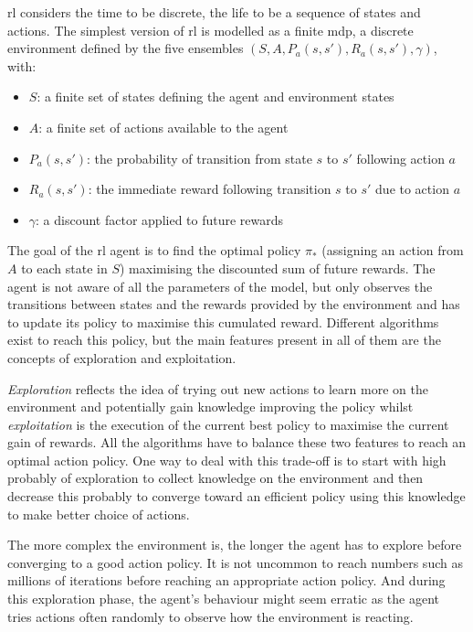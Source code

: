 	\gls{rl} considers the time to be discrete, the life to be a sequence of states and actions. The simplest version of \gls{rl} is modelled as a finite \acrfull{mdp}, a discrete environment defined by the five ensembles $(S, A, P_a(s,s'), R_a(s,s'), \gamma)$, with:
	\begin{itemize}
		\item $S$: a finite set of states defining the agent and environment states
		\item $A$: a finite set of actions available to the agent
		\item $P_a(s,s')$: the probability of transition from state $s$ to $s'$ following action $a$
		\item $R_a(s,s')$: the immediate reward following transition $s$ to $s'$ due to action $a$
		\item $\gamma$: a discount factor applied to future rewards
	\end{itemize}
	
	The goal of the \gls{rl} agent is to find the optimal policy $\pi_*$ (assigning an action from $A$ to each state in $S$) maximising the discounted sum of future rewards. The agent is not aware of all the parameters of the model, but only observes the transitions between states and the rewards provided by the environment and has to update its policy to maximise this cumulated reward. Different algorithms exist to reach this policy, but the main features present in all of them are the concepts of exploration and exploitation.
	
	\textit{Exploration} reflects the idea of trying out new actions to learn more on the environment and potentially gain knowledge improving the policy whilst \textit{exploitation} is the execution of the current best policy to maximise the current gain of rewards. All the algorithms have to balance these two features to reach an optimal action policy. One way to deal with this trade-off is to start with high probably of exploration to collect knowledge on the environment and then decrease this probably to converge toward an efficient policy using this knowledge to make better choice of actions.
	
	The more complex the environment is, the longer the agent has to explore before converging to a good action policy. It is not uncommon to reach numbers such as millions of iterations before reaching an appropriate action policy. And during this exploration phase, the agent's behaviour might seem erratic as the agent tries actions often randomly to observe how the environment is reacting.
	
